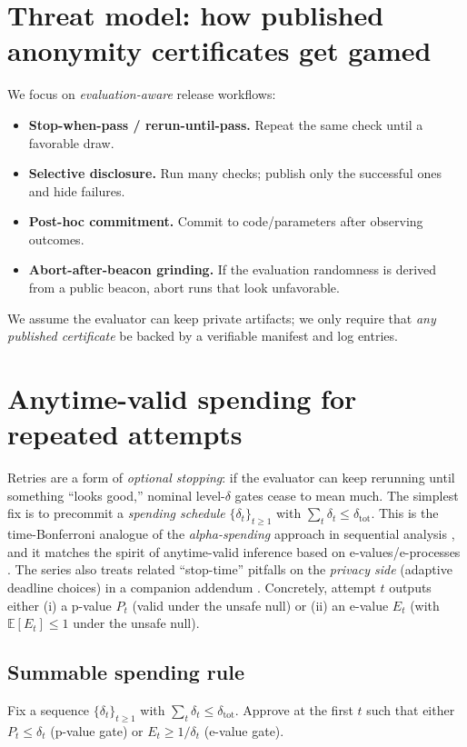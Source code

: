 \documentclass[11pt]{article}
\newcommand{\E}{\mathbb{E}}
\begin{document}
\section{Threat model: how published anonymity certificates get gamed}
We focus on \emph{evaluation-aware} release workflows:
\begin{itemize}
\item \textbf{Stop-when-pass / rerun-until-pass.} Repeat the same check until a favorable draw.
\item \textbf{Selective disclosure.} Run many checks; publish only the successful ones and hide failures.
\item \textbf{Post-hoc commitment.} Commit to code/parameters after observing outcomes.
\item \textbf{Abort-after-beacon grinding.} If the evaluation randomness is derived from a public beacon, abort runs that look unfavorable.
\end{itemize}
We assume the evaluator can keep private artifacts; we only require that \emph{any published certificate} be backed by a verifiable manifest and log entries.

\section{Anytime-valid spending for repeated attempts}
Retries are a form of \emph{optional stopping}: if the evaluator can keep rerunning until something ``looks good,'' nominal level-$\delta$ gates cease to mean much.
The simplest fix is to precommit a \emph{spending schedule} $\{\delta_t\}_{t\ge 1}$ with $\sum_t\delta_t\le\delta_{\mathrm{tot}}$.
This is the time-Bonferroni analogue of the \emph{alpha-spending} approach in sequential analysis \cite{lan_demets1983}, and it matches the spirit of anytime-valid inference based on e-values/e-processes \cite{ville1939,shafer2021betting,howard2020timeuniform,ramdas2023gts_savi}.
The series also treats related ``stop-time'' pitfalls on the \emph{privacy side} (adaptive deadline choices) in a companion addendum \cite{series:stoptimeaddendum}.
Concretely, attempt $t$ outputs either (i) a p-value $P_t$ (valid under the unsafe null) or (ii) an e-value $E_t$ (with $\E[E_t]\le 1$ under the unsafe null).

\subsection{Summable spending rule}
Fix a sequence $\{\delta_t\}_{t\ge 1}$ with $\sum_t \delta_t \le \delta_{\text{tot}}$.
Approve at the first $t$ such that either $P_t \le \delta_t$ (p-value gate) or $E_t \ge 1/\delta_t$ (e-value gate).
\end{document}
